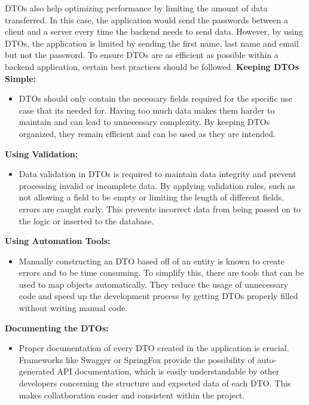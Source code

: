     DTOs also help optimizing performance by limiting the amount of data transferred. In this case, the application would send the passwords between a client and a server every time the backend needs to send data. However, by using DTOs, the application is limited by sending the first name, last name and email but not the password. \newline 
    To ensure DTOs are as efficient as possible within a backend application, certain best practices should be followed. \newline 
    \textbf{Keeping DTOs Simple:}
        \begin{itemize}
            \item DTOs should only contain the necessary fields required for the specific use case that its needed for. Having too much data makes them harder to maintain and can lead to unnecessary complexity. By keeping DTOs organized, they remain efficient and can be used as they are intended.
        \end{itemize}
    \textbf{Using Validation:}
        \begin{itemize}
            \item Data validation in DTOs is required to maintain data integrity and prevent processing invalid or incomplete data. By applying validation rules, such as not allowing a field to be empty or limiting the length of different fields, errors are caught early. This prevents incorrect data from being passed on to the logic or inserted to the database.
        \end{itemize}
    \textbf{Using Automation Tools:}
        \begin{itemize}
            \item Manually constructing an DTO based off of an entity is known to create errors and to be time consuming. To simplify this, there are tools that can be used to map objects automatically. They reduce the usage of unnecessary code and speed up the development process by getting DTOs properly filled without writing manual code.
        \end{itemize}
    \textbf{Documenting the DTOs:}
        \begin{itemize}
            \item Proper documentation of every DTO created in the application is crucial. Frameworks like Swagger or SpringFox provide the possibility of auto-generated API documentation, which is easily understandable by other developers concerning the structure and expected data of each DTO. This makes collatboration easier and consistent within the project. 
        \end{itemize} 
